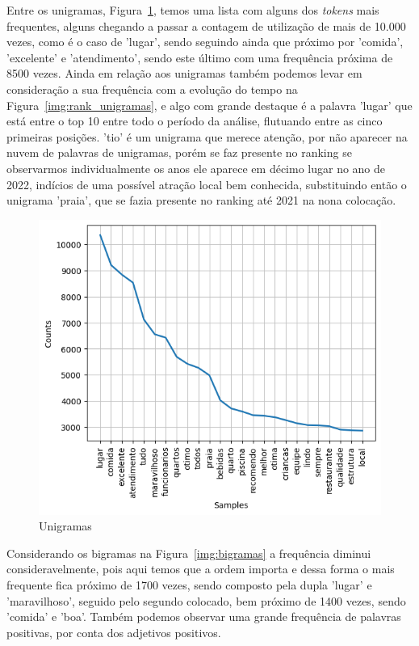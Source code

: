 Entre os unigramas, Figura~\ref{img:unigramas}, temos uma lista com alguns dos \textit{tokens} mais frequentes, alguns chegando a passar a contagem de utilização de mais de 10.000 vezes, como é o caso de 'lugar', sendo seguindo ainda que próximo por 'comida', 'excelente' e 'atendimento', sendo este último com uma frequência próxima de 8500 vezes. Ainda em relação aos unigramas também podemos levar em consideração a sua frequência com a evolução do tempo na Figura~\ref{img:rank_unigramas}, e algo com grande destaque é a palavra 'lugar' que está entre o top 10 entre todo o período da análise, flutuando entre as cinco primeiras posições. 'tio' é um unigrama que merece atenção, por não aparecer na nuvem de palavras de unigramas, porém se faz presente no ranking se observarmos individualmente os anos ele aparece em décimo lugar no ano de 2022, indícios de uma possível atração local bem conhecida, substituindo então o unigrama 'praia', que se fazia presente no ranking até 2021 na nona colocação.

\begin{figure}
	\centering
	\includegraphics[width=.8\textwidth]{figs/exploratoria/unigramas.png}
	\caption{Unigramas}
	\label{img:unigramas}
\end{figure}

Considerando os bigramas na Figura~\ref{img:bigramas} a frequência diminui consideravelmente, pois aqui temos que a ordem importa e dessa forma o mais frequente fica próximo de 1700 vezes, sendo composto pela dupla 'lugar' e 'maravilhoso', seguido pelo segundo colocado, bem próximo de 1400 vezes, sendo 'comida' e 'boa'. Também podemos observar uma grande frequência de palavras positivas, por conta dos adjetivos positivos.

